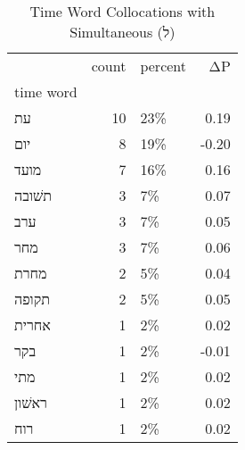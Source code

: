 \begin{table}[htbp!]
\centering
\caption{Time Word Collocations with Simultaneous (ל)}
\label{table:simל_head_cpd}
\begin{tabular}{lrlr}
\toprule
{} &  count & percent &    ΔP \\
time word &        &         &       \\
\midrule
עת        &     10 &     23\% &  0.19 \\
יום       &      8 &     19\% & -0.20 \\
מועד      &      7 &     16\% &  0.16 \\
תשׁובה    &      3 &      7\% &  0.07 \\
ערב       &      3 &      7\% &  0.05 \\
מחר       &      3 &      7\% &  0.06 \\
מחרת      &      2 &      5\% &  0.04 \\
תקופה     &      2 &      5\% &  0.05 \\
אחרית     &      1 &      2\% &  0.02 \\
בקר       &      1 &      2\% & -0.01 \\
מתי       &      1 &      2\% &  0.02 \\
ראשׁון    &      1 &      2\% &  0.02 \\
רוח       &      1 &      2\% &  0.02 \\
\bottomrule
\end{tabular}
\end{table}
